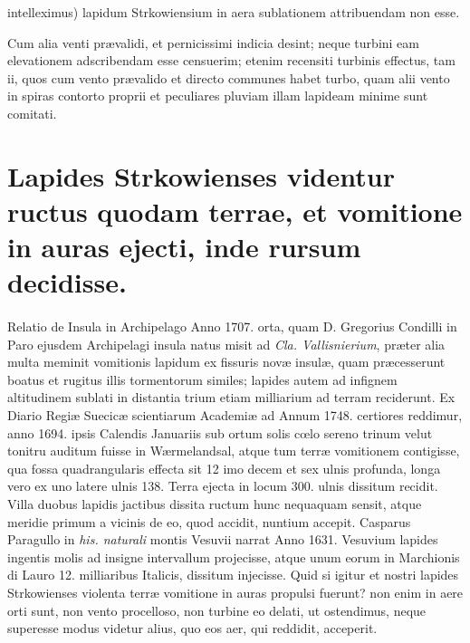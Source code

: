 \documentclass[a4paper, 11pt, oneside, polutonikogreek, latin]{article}
\begin{document}
intelleximus) lapidum Strkowiensium in aera sublationem attribuendam non esse.

Cum alia venti prævalidi, et pernicissimi indicia desint; neque turbini eam elevationem adscribendam esse censuerim; etenim recensiti turbinis effectus, tam ii, quos cum vento prævalido et directo communes habet turbo, quam alii vento in spiras contorto proprii et peculiares pluviam illam lapideam minime sunt comitati.
\clearpage
\section[Lapides Strkowienses videntur ructus quodam terrae, et vomitione in auras ejecti, inde rursum decidisse.]{\bfseries{Lapides Strkowienses videntur ructus quodam terrae, et vomitione in auras ejecti, inde rursum decidisse.}}
\paragraph{}
Relatio de Insula in Archipelago Anno 1707. orta, quam D. Gregorius Condilli in Paro ejusdem Archipelagi insula natus misit ad \emph{Cla. Vallisnierium}, præter alia multa meminit vomitionis lapidum ex fissuris novæ insulæ, quam præcesserunt boatus et rugitus illis tormentorum similes; lapides autem ad infignem altitudinem sublati in distantia trium etiam milliarium ad terram reciderunt. Ex Diario Regiæ Suecicæ scientiarum Academiæ ad Annum 1748. certiores reddimur, anno 1694. ipsis Calendis Januariis sub ortum solis cœlo sereno trinum velut tonitru auditum fuisse in Wærmelandsal, atque tum terræ vomitionem contigisse, qua fossa quadrangularis effecta sit 12 imo decem et sex ulnis profunda, longa vero ex uno latere ulnis 138. Terra ejecta in locum 300. ulnis dissitum recidit. Villa duobus lapidis jactibus dissita ructum hunc nequaquam sensit, atque meridie primum a vicinis de eo, quod accidit, nuntium accepit. Casparus Paragullo in \emph{his. naturali} montis Vesuvii narrat Anno 1631. Vesuvium lapides ingentis molis ad insigne intervallum projecisse, atque unum eorum in Marchionis di Lauro 12. milliaribus Italicis, dissitum injecisse. Quid si igitur et nostri lapides Strkowienses violenta terræ vomitione in auras propulsi fuerunt? non enim in aere orti sunt, non vento procelloso, non turbine eo delati, ut ostendimus, neque superesse modus videtur alius, quo eos aer, qui reddidit, acceperit.
\end{document}
